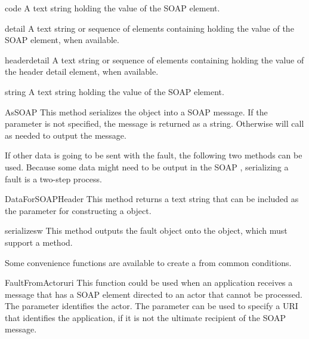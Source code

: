 \begin{memberdesc}{code}
A text string holding the value of the SOAP  element.
\end{memberdesc}

\begin{memberdesc}{detail}
A text string or sequence of elements containing holding the value of the
SOAP  element, when available.
\end{memberdesc}

\begin{memberdesc}{headerdetail}
A text string or sequence of elements containing holding the value of the
\ZSI{} header detail element, when available.
\end{memberdesc}

\begin{memberdesc}{string}
A text string holding the value of the SOAP  element.
\end{memberdesc}

\begin{methoddesc}{AsSOAP}{}
This method serializes the  object into a SOAP message.
If the  parameter is not specified, the message is returned
as a string.
Otherwise  will call  as needed
to output the message.
\end{methoddesc}

If other data is going to be sent with the fault, the following
two methods can be used.
Because some data might need to be output in the SOAP ,
serializing a fault is a two-step process.

\begin{methoddesc}{DataForSOAPHeader}{}
This method returns a text string that can be included as the
 parameter for constructing a  object.
\end{methoddesc}

\begin{methoddesc}{serialize}{sw}
This method outputs the fault object onto the  object,
which must support a  method.
\end{methoddesc}

Some convenience functions are available to create a 
from common conditions.

\begin{funcdesc}{FaultFromActor}{uri}
This function could be used when an application receives a message
that has a SOAP  element directed to an actor that
cannot be processed.
The  parameter identifies the actor.
The  parameter can be used to specify a URI that identifies the
application, if it is not the ultimate recipient of the SOAP message.
\end{funcdesc}

